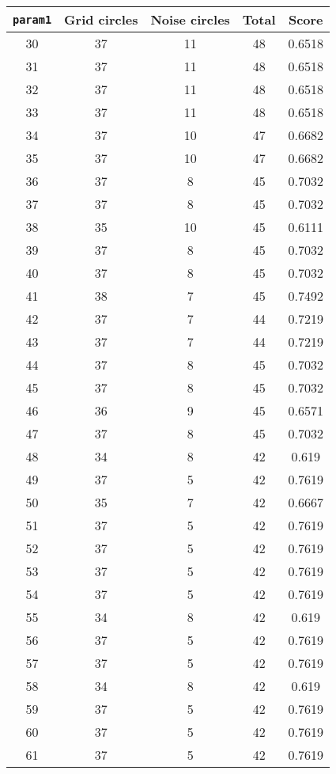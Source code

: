 \documentclass[letterpaper, 12pt]{article}
\begin{document}
\begin{longtable}{|c|c|c|c|c|}
\hline
\textbf{\texttt{param1}} & \textbf{Grid circles} & \textbf{Noise circles} & \textbf{Total} & \textbf{Score} \\
\hline
30 & 37 & 11 & 48 & 0.6518 \\
\hline
31 & 37 & 11 & 48 & 0.6518 \\
\hline
32 & 37 & 11 & 48 & 0.6518 \\
\hline
33 & 37 & 11 & 48 & 0.6518 \\
\hline
34 & 37 & 10 & 47 & 0.6682 \\
\hline
35 & 37 & 10 & 47 & 0.6682 \\
\hline
36 & 37 & 8 & 45 & 0.7032 \\
\hline
37 & 37 & 8 & 45 & 0.7032 \\
\hline
38 & 35 & 10 & 45 & 0.6111 \\
\hline
39 & 37 & 8 & 45 & 0.7032 \\
\hline
40 & 37 & 8 & 45 & 0.7032 \\
\hline
41 & 38 & 7 & 45 & 0.7492 \\
\hline
42 & 37 & 7 & 44 & 0.7219 \\
\hline
43 & 37 & 7 & 44 & 0.7219 \\
\hline
44 & 37 & 8 & 45 & 0.7032 \\
\hline
45 & 37 & 8 & 45 & 0.7032 \\
\hline
46 & 36 & 9 & 45 & 0.6571 \\
\hline
47 & 37 & 8 & 45 & 0.7032 \\
\hline
48 & 34 & 8 & 42 & 0.619 \\
\hline
49 & 37 & 5 & 42 & 0.7619 \\
\hline
50 & 35 & 7 & 42 & 0.6667 \\
\hline
51 & 37 & 5 & 42 & 0.7619 \\
\hline
52 & 37 & 5 & 42 & 0.7619 \\
\hline
53 & 37 & 5 & 42 & 0.7619 \\
\hline
54 & 37 & 5 & 42 & 0.7619 \\
\hline
55 & 34 & 8 & 42 & 0.619 \\
\hline
56 & 37 & 5 & 42 & 0.7619 \\
\hline
57 & 37 & 5 & 42 & 0.7619 \\
\hline
58 & 34 & 8 & 42 & 0.619 \\
\hline
59 & 37 & 5 & 42 & 0.7619 \\
\hline
60 & 37 & 5 & 42 & 0.7619 \\
\hline
61 & 37 & 5 & 42 & 0.7619 \\

\end{longtable}
\end{document}
